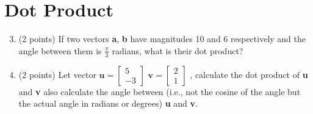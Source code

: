 \documentclass{article}%
\begin{document}
\section*{Dot Product}
\begin{enumerate}
  \setcounter{enumi}{2}
    \item (2 points) If two vectors \textbf{a}, \textbf{b} have magnitudes 10 and 6 respectively and the angle between them is $\frac{\pi}{3}$ radians, what is their dot product?
    

    
    \item (2 points) Let vector $\mathbf{u} = \begin{bmatrix} 5\\ -3 \end{bmatrix}$  $\mathbf{v} = \begin{bmatrix}2\\ 1\end{bmatrix}$ , calculate the dot product of \textbf{u} and \textbf{v} also calculate the angle between (i.e., not the cosine of the angle but the actual angle in radians or degrees) \textbf{u} and \textbf{v}. \\


\end{enumerate}
\end{document}
